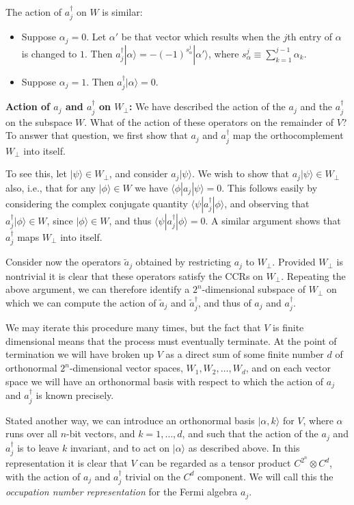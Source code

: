 \documentclass[12pt]{article}
\begin{document}
The action of $a_j^\dagger$ on $W$ is similar:
\begin{itemize}
\item Suppose $\alpha_j = 0$.  Let $\alpha'$ be that vector which
  results when the $j$th entry of $\alpha$ is changed to $1$.  Then
  $a_j^\dagger|\alpha\rangle = -(-1)^{s_\alpha^j}|\alpha'\rangle$,
  where $s_\alpha^j \equiv \sum_{k=1}^{j-1} \alpha_k$.

\item Suppose $\alpha_j = 1$.  Then $a_j^\dagger |\alpha\rangle = 0$.
\end{itemize}

\textbf{Action of $a_j$ and $a_j^\dagger$ on $W_\perp$:} We have
described the action of the $a_j$ and the $a_j^\dagger$ on the
subspace $W$.  What of the action of these operators on the remainder
of $V$?  To answer that question, we first show that $a_j$ and
$a_j^\dagger$ map the orthocomplement $W_\perp$ into itself.

To see this, let $|\psi\rangle \in W_\perp$, and consider
$a_j|\psi\rangle$.  We wish to show that $a_j|\psi\rangle \in W_\perp$
also, i.e., that for any $|\phi\rangle \in W$ we have $\langle
\phi|a_j|\psi\rangle = 0$.  This follows easily by considering the
complex conjugate quantity $\langle \psi|a_j^\dagger |\phi\rangle$,
and observing that $a_j^\dagger |\phi\rangle \in W$, since
$|\phi\rangle \in W$, and thus $\langle \psi|a_j^\dagger |\phi\rangle
= 0$.  A similar argument shows that $a_j^\dagger$ maps $W_\perp$ into
itself.

Consider now the operators $\tilde a_j$ obtained by restricting $a_j$
to $W_\perp$.  Provided $W_\perp$ is nontrivial it is clear that these
operators satisfy the CCRs on $W_\perp$.  Repeating the above
argument, we can therefore identify a $2^n$-dimensional subspace of
$W_\perp$ on which we can compute the action of $\tilde a_j$ and
$\tilde a_j^\dagger$, and thus of $a_j$ and $a_j^\dagger$.

We may iterate this procedure many times, but the fact that $V$ is
finite dimensional means that the process must eventually terminate.
At the point of termination we will have broken up $V$ as a direct sum
of some finite number $d$ of orthonormal $2^n$-dimensional vector
spaces, $W_1,W_2,\ldots,W_d$, and on each vector space we will have an
orthonormal basis with respect to which the action of $a_j$ and
$a_j^\dagger$ is known precisely.

Stated another way, we can introduce an orthonormal basis
$|\alpha,k\rangle$ for $V$, where $\alpha$ runs over all $n$-bit
vectors, and $k = 1,\ldots,d$, and such that the action of the $a_j$
and $a_j^\dagger$ is to leave $k$ invariant, and to act on
$|\alpha\rangle$ as described above.  In this representation it is
clear that $V$ can be regarded as a tensor product $C^{2^n} \otimes
C^d$, with the action of $a_j$ and $a_j^\dagger$ trivial on the $C^d$
component.  We will call this the \emph{occupation number
  representation} for the Fermi algebra $a_j$.
\end{document}
